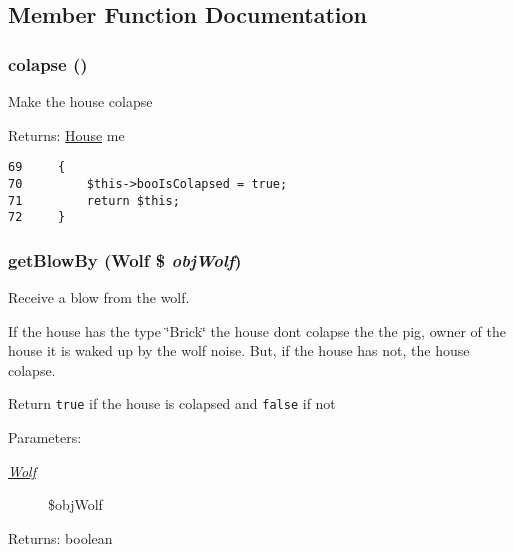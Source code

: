 \subsection{Member Function Documentation}
\hypertarget{class_house_cd0f1de87d37a838789035eaf58f17b0}{
\subsubsection[{colapse}]{\setlength{\rightskip}{0pt plus 5cm}colapse ()}}
\label{class_house_cd0f1de87d37a838789035eaf58f17b0}


Make the house colapse

\begin{Desc}
\item[Returns:]\hyperlink{class_house}{House} me \end{Desc}


\begin{Code}\begin{verbatim}69     {
70         $this->booIsColapsed = true;
71         return $this;
72     }
\end{verbatim}
\end{Code}


\hypertarget{class_house_20552b3b737f2189821f0362e2bd9cee}{
\subsubsection[{getBlowBy}]{\setlength{\rightskip}{0pt plus 5cm}getBlowBy ({\bf Wolf} \$ {\em objWolf})}}
\label{class_house_20552b3b737f2189821f0362e2bd9cee}


Receive a blow from the wolf.

If the house has the type \char`\"{}Brick\char`\"{} the house dont colapse the the pig, owner of the house it is waked up by the wolf noise. But, if the house has not, the house colapse.

Return {\tt true} if the house is colapsed and {\tt false} if not

\begin{Desc}
\item[Parameters:]
\begin{description}
\item[{\em \hyperlink{class_wolf}{Wolf}}]\$objWolf \end{description}
\end{Desc}
\begin{Desc}
\item[Returns:]boolean \end{Desc}


